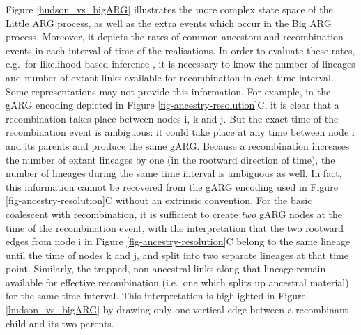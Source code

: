 \documentclass{article}
\newcommand{\noderef}[1]{\textsf{#1}}
\begin{document}
Figure \ref{hudson_vs_bigARG} illustrates the more complex state space
of the Little ARG process, as well as the extra events which occur in the Big ARG process.
Moreover, it depicts the rates of common ancestors and recombination events in each
interval of time of the realisations.
In order to evaluate these rates, e.g.\ for likelihood-based inference
\citep{baumdicker2021efficient, mahmoudi2022bayesian},
it is necessary to know the number of lineages and number of extant links
available for recombination in each time interval.
Some representations may not provide this information.
For example, in the gARG encoding depicted in Figure \ref{fig-ancestry-resolution}C,
it is clear that a recombination takes place between nodes \noderef{i}, \noderef{k} and \noderef{j}.
But the exact time of the recombination event is ambiguous: it could take place at any time between node \noderef{i} and its parents and produce the same gARG.
Because a recombination increases the number of extant lineages by one (in the rootward direction of time), the number of lineages during the same time interval is ambiguous as well.
In fact, this information cannot be recovered from the gARG encoding used in Figure \ref{fig-ancestry-resolution}C without an extrinsic convention.
For the basic coalescent with recombination,
it is sufficient to create \emph{two} gARG nodes at the time of the recombination event, with the interpretation that the two rootward edges from node \noderef{i} in Figure \ref{fig-ancestry-resolution}C belong to the same lineage until the time of nodes \noderef{k} and \noderef{j}, and split into two separate lineages at that time point.
Similarly, the trapped, non-ancestral links along that lineage remain available for effective recombination (i.e.\ one which splits up ancestral material) for the same time interval.
This interpretation is highlighted in
Figure \ref{hudson_vs_bigARG} by drawing only one vertical edge between a recombinant child and its two parents.


\end{document}
